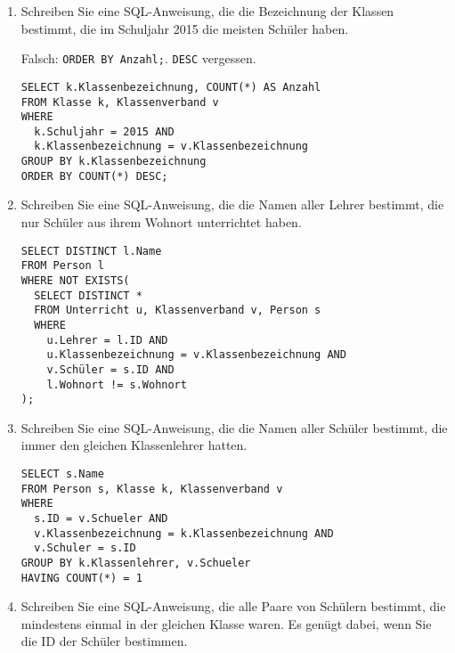 \documentclass{lehramt-informatik-aufgabe}
\begin{document}
\begin{enumerate}

\item Schreiben Sie eine SQL-Anweisung, die die Bezeichnung der Klassen
bestimmt, die im Schuljahr 2015 die meisten Schüler haben.

\begin{antwort}
Falsch: \verb|ORDER BY Anzahl;|. \verb|DESC| vergessen.

\begin{verbatim}
SELECT k.Klassenbezeichnung, COUNT(*) AS Anzahl
FROM Klasse k, Klassenverband v
WHERE
  k.Schuljahr = 2015 AND
  k.Klassenbezeichnung = v.Klassenbezeichnung
GROUP BY k.Klassenbezeichnung
ORDER BY COUNT(*) DESC;
\end{verbatim}
\end{antwort}


\item Schreiben Sie eine SQL-Anweisung, die die Namen aller Lehrer
bestimmt, die nur Schüler aus ihrem Wohnort unterrichtet haben.

\begin{antwort}
\begin{verbatim}
SELECT DISTINCT l.Name
FROM Person l
WHERE NOT EXISTS(
  SELECT DISTINCT *
  FROM Unterricht u, Klassenverband v, Person s
  WHERE
    u.Lehrer = l.ID AND
    u.Klassenbezeichnung = v.Klassenbezeichnung AND
    v.Schüler = s.ID AND
    l.Wohnort != s.Wohnort
);
\end{verbatim}
\end{antwort}


\item Schreiben Sie eine SQL-Anweisung, die die Namen aller Schüler
bestimmt, die immer den gleichen Klassenlehrer hatten.

\begin{antwort}
\begin{verbatim}
SELECT s.Name
FROM Person s, Klasse k, Klassenverband v
WHERE
  s.ID = v.Schueler AND
  v.Klassenbezeichnung = k.Klassenbezeichnung AND
  v.Schuler = s.ID
GROUP BY k.Klassenlehrer, v.Schueler
HAVING COUNT(*) = 1
\end{verbatim}
\end{antwort}


\item Schreiben Sie eine SQL-Anweisung, die alle Paare von Schülern
bestimmt, die mindestens einmal in der gleichen Klasse waren. Es genügt
dabei, wenn Sie die ID der Schüler bestimmen.


\end{enumerate}
\end{document}

